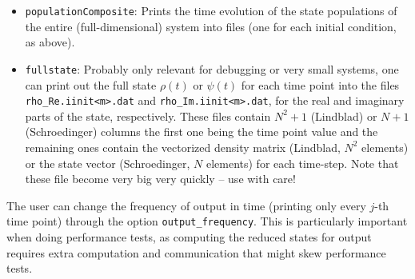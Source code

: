 \documentclass[11pt]{article}
\begin{document}
\begin{itemize}
  \item \texttt{populationComposite}: Prints the time evolution of the state populations of the entire (full-dimensional) system into files (one for each initial condition, as above). 
  \item \texttt{fullstate}: Probably only relevant for debugging or very small systems, one can print out the full state $\rho(t)$ or $\psi(t)$ for each time point into the files \texttt{rho\_Re.iinit<m>.dat} and \texttt{rho\_Im.iinit<m>.dat}, for the real and imaginary parts of the state, respectively. These files contain $N^2 +1$ (Lindblad) or $N+1$ (Schroedinger) columns the first one being the time point value and the remaining ones contain the vectorized density matrix (Lindblad, $N^2$ elements) or the state vector (Schroedinger, $N$ elements) for each time-step. Note that these file become very big very quickly -- use with care!
\end{itemize}

The user can change the frequency of output in time (printing only every $j$-th time point) through the option \texttt{output\_frequency}. This is particularly important when doing performance tests, as computing the reduced states for output requires extra computation and communication that might skew performance tests. 
\end{document}
